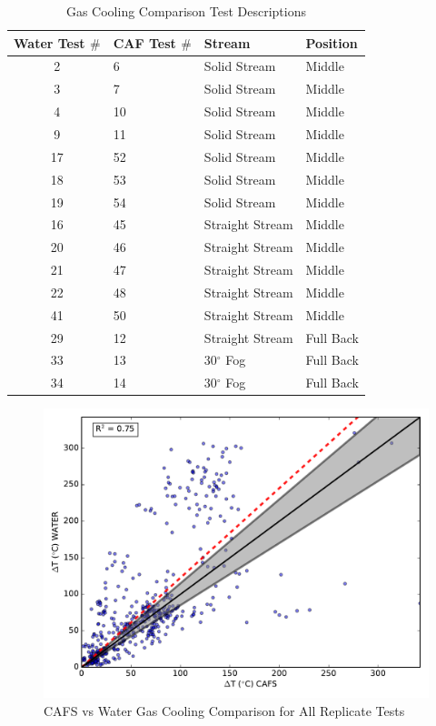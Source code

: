 \documentclass[12pt,oneside]{book}
\begin{document}
\begin{table}[!ht]
\centering
\caption{Gas Cooling Comparison Test Descriptions}\label{tab:Gas_Cooling_Descriptions}
\begin{tabular}{clll}
\toprule[1.5pt]
Water Test $\#$  & CAF Test  $\#$	& Stream			  & Position  \\
\midrule
 2               & 6                &  Solid Stream       &  Middle   \\
 3               & 7                &  Solid Stream       &  Middle   \\
 4               & 10               &  Solid Stream       &  Middle   \\
 9               & 11               &  Solid Stream       &  Middle   \\
 17              & 52               &  Solid Stream       &  Middle   \\
 18              & 53               &  Solid Stream       &  Middle   \\
 19              & 54               &  Solid Stream       &  Middle   \\
 16              & 45               &  Straight Stream    &  Middle   \\
 20              & 46               &  Straight Stream    &  Middle   \\
 21              & 47               &  Straight Stream    &  Middle   \\
 22              & 48               &  Straight Stream    &  Middle   \\
 41              & 50               &  Straight Stream    &  Middle   \\
 29              & 12               &  Straight Stream    &  Full Back   \\
 33              & 13               &  30$^{\circ}$ Fog   &  Full Back   \\
 34              & 14               &  30$^{\circ}$ Fog   &  Full Back   \\
\bottomrule[1.25pt]
\end{tabular}\par
\end{table}

\begin{figure}[!ht]
	\includegraphics[width=.7\columnwidth]{../Figures/Gas_Cooling/Combined_scatter}
	\caption{CAFS vs Water Gas Cooling Comparison for All Replicate Tests}
	\label{fig:combined_all}
\end{figure}
\end{document}
